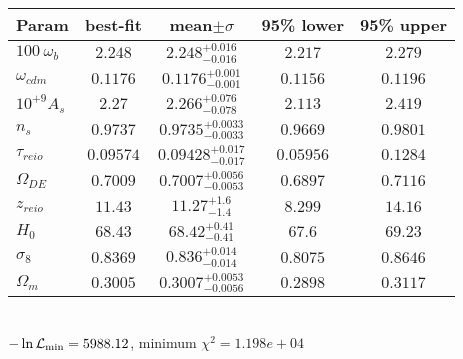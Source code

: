 \begin{tabular}{|l|c|c|c|c|} 
 \hline 
Param & best-fit & mean$\pm\sigma$ & 95\% lower & 95\% upper \\ \hline 
$100~\omega_{b }$ &$2.248$ & $2.248_{-0.016}^{+0.016}$ & $2.217$ & $2.279$ \\ 
$\omega_{cdm }$ &$0.1176$ & $0.1176_{-0.001}^{+0.001}$ & $0.1156$ & $0.1196$ \\ 
$10^{+9}A_{s }$ &$2.27$ & $2.266_{-0.078}^{+0.076}$ & $2.113$ & $2.419$ \\ 
$n_{s }$ &$0.9737$ & $0.9735_{-0.0033}^{+0.0033}$ & $0.9669$ & $0.9801$ \\ 
$\tau_{reio }$ &$0.09574$ & $0.09428_{-0.017}^{+0.017}$ & $0.05956$ & $0.1284$ \\ 
$\Omega_{DE}$ &$0.7009$ & $0.7007_{-0.0053}^{+0.0056}$ & $0.6897$ & $0.7116$ \\ 
$z_{reio }$ &$11.43$ & $11.27_{-1.4}^{+1.6}$ & $8.299$ & $14.16$ \\ 
$H_{0 }$ &$68.43$ & $68.42_{-0.41}^{+0.41}$ & $67.6$ & $69.23$ \\ 
$\sigma_8$ &$0.8369$ & $0.836_{-0.014}^{+0.014}$ & $0.8075$ & $0.8646$ \\ 
$\Omega_{m }$ &$0.3005$ & $0.3007_{-0.0056}^{+0.0053}$ & $0.2898$ & $0.3117$ \\ 
\hline 
 \end{tabular} \\ 
$-\ln{\cal L}_\mathrm{min} =5988.12$, minimum $\chi^2=1.198e+04$ \\ 
